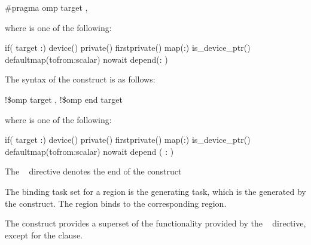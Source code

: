 {{\begin{boxedcode}
\#pragma omp target \plc{[clause[ [},\plc{] clause] ... ] new-line}
\end{boxedcode}

where  is one of the following:

\begin{indentedcodelist}
if(\plc{[} target :\plc{] scalar-expression})
device()
private()
firstprivate()
map(\plc{[[map-type-modifier[,]] map-type}:\plc{ ] list})
is\_device\_ptr()
defaultmap(tofrom:scalar)
nowait
depend(: )
\end{indentedcodelist}
\ccppspecificend

\begin{samepage}
\smallskip
\fortranspecificstart
The syntax of the  construct is as follows:

\begin{boxedcode}
!\$omp target \plc{[clause[ [},\plc{] clause] ... ]}
!\$omp end target
\end{boxedcode}
\end{samepage}

\begin{samepage}
where  is one of the following:

\begin{indentedcodelist}
if(\plc{[} target :\plc{] scalar-logical-expression})
device()
private()
firstprivate()
map(\plc{[[map-type-modifier[,]] map-type}:\plc{ ] list})
is\_device\_ptr()
defaultmap(tofrom:scalar)
nowait
depend ( : )
\end{indentedcodelist}
\end{samepage}

The ~ directive denotes the end of the  construct
\fortranspecificend

\binding
The binding task set for a  region is the
generating task, which is the  generated
by the  construct. The 
region binds to the corresponding  region.

\descr
The  construct provides a superset of the functionality
provided by the ~ directive, except for 
the  clause.

}}
